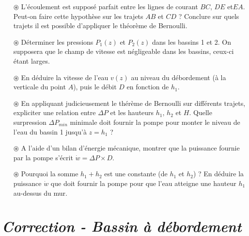 \documentclass{report}
\begin{document}
\begin{itemize}

	\item[$\circledast$] L'écoulement est supposé parfait entre les lignes de courant $BC$, $DE$ et$EA$. Peut-on faire cette hypothèse sur les trajets $AB$ et $CD$ ? Conclure sur quels trajets il est possible d'appliquer le théorème de Bernoulli.

	\item[$\circledast$] Déterminer les pressions $P_1(z)$ et $P_2(z)$ dans les bassins 1 et 2. On supposera que le champ de vitesse est négligeable dans les bassins, ceux-ci étant larges.
	
	\item[$\circledast$] En déduire la vitesse de l'eau $v(z)$ au niveau du débordement (à la verticale du point $A$), puis le débit $D$ en fonction de $h_1$. 
	
	\item[$\circledast$] En appliquant judicieusement le thérème de Bernoulli sur différents trajets, expliciter une relation entre $\Delta P$ et les hauteurs $h_1$, $h_2$ et $H$.  Quelle surpression $\Delta P_{min}$ minimale doit fournir la pompe pour monter le niveau de l'eau du bassin 1 jusqu'à $z=h_1$ ?
	
	\item[$\circledast$] A l'aide d'un bilan d'énergie mécanique, montrer que la puissance fournie par la pompe s'écrit $\dot{w}=\Delta P\times D$. 
	
	\item[$\circledast$] Pourquoi la somme $h_1+h_2$ est une constante (de $h_1$ et $h_2$) ? En déduire la puissance $\dot{w}$ que doit fournir la pompe pour que l'eau atteigne une hauteur $h_1$ au-dessus du mur.

\end{itemize}

\newpage

\section*{\textit{Correction - Bassin à débordement}}
\end{document}
